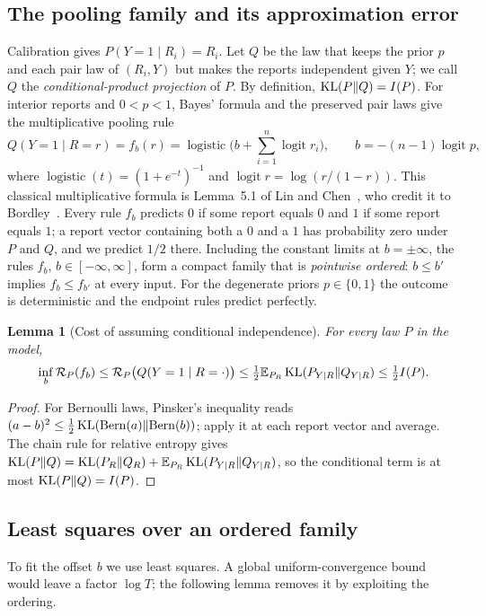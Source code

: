 \documentclass[11pt,a4paper]{article}
\newtheorem{lemma}[theorem]{Lemma}
\theoremstyle{remark}
\newcommand{\KL}{\mathop{\rm KL}\nolimits}
\newcommand{\E}{\mathbb E}
\newcommand{\cR}{\mathcal R}
\newcommand{\sig}{\operatorname{logistic}}
\newcommand{\logit}{\operatorname{logit}}
\begin{document}
\subsection{The pooling family and its approximation error}
Calibration gives $P(Y=1\mid R_i)=R_i$. Let $Q$ be the law that keeps the prior $p$ and each pair law of $(R_i,Y)$ but makes the reports independent given $Y$; we call $Q$ the \emph{conditional-product projection} of $P$. By definition, $\KL(P\|Q)=I(P)$. For interior reports and $0<p<1$, Bayes' formula and the preserved pair laws give the multiplicative pooling rule
\[
 Q(Y=1\mid R=r)=f_b(r)=\sig\!\Big( b+\sum_{i=1}^n\logit r_i\Big),
 \qquad b=-(n-1)\logit p,
\]
where $\sig(t)=(1+e^{-t})^{-1}$ and $\logit r=\log(r/(1-r))$. This classical multiplicative formula is Lemma~5.1 of Lin and Chen~\cite{lc}, who credit it to Bordley~\cite{bordley}. Every rule $f_b$ predicts $0$ if some report equals $0$ and $1$ if some report equals $1$; a report vector containing both a $0$ and a $1$ has probability zero under $P$ and $Q$, and we predict $1/2$ there. Including the constant limits at $b=\pm\infty$, the rules $f_b$, $b\in[-\infty,\infty]$, form a compact family that is \emph{pointwise ordered}: $b\le b'$ implies $f_b\le f_{b'}$ at every input. For the degenerate priors $p\in\{0,1\}$ the outcome is deterministic and the endpoint rules predict perfectly.

\begin{lemma}[Cost of assuming conditional independence]\label{lem:approx}
For every law $P$ in the model,
\begin{equation}\label{eq:approx}
 \inf_b\cR_P(f_b)\le \cR_P\big(Q(Y=1\mid R=\cdot)\big)\le\tfrac12\E_{P_R}\KL(P_{Y\mid R}\|Q_{Y\mid R})
 \le \tfrac12 I(P).
\end{equation}
\end{lemma}
\begin{proof}
For Bernoulli laws, Pinsker's inequality reads $(a-b)^2\le\tfrac12\KL(\mathrm{Bern}(a)\|\mathrm{Bern}(b))$; apply it at each report vector and average. The chain rule for relative entropy gives $\KL(P\|Q)=\KL(P_R\|Q_R)+\E_{P_R}\KL(P_{Y\mid R}\|Q_{Y\mid R})$, so the conditional term is at most $\KL(P\|Q)=I(P)$.
\end{proof}

\subsection{Least squares over an ordered family}
To fit the offset $b$ we use least squares. A global uniform-convergence bound would leave a factor $\log T$; the following lemma removes it by exploiting the ordering.
\end{document}
